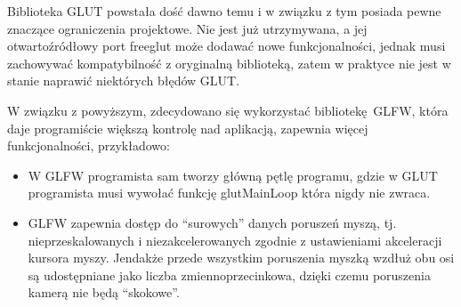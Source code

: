 \documentclass[a4paper]{article}
\begin{document}
Biblioteka GLUT powstała dość dawno temu i w związku z tym posiada pewne
znaczące ograniczenia projektowe. Nie jest już utrzymywana, a jej
otwartoźródłowy port freeglut może dodawać nowe funkcjonalności, jednak musi
zachowywać kompatybilność z oryginalną biblioteką, zatem w praktyce nie jest w
stanie naprawić niektórych błędów GLUT.

W związku z powyższym, zdecydowano się wykorzystać bibliotekę GLFW, która daje
programiście większą kontrolę nad aplikacją, zapewnia więcej funkcjonalności,
przykładowo:

\begin{itemize}
    \item W GLFW programista sam tworzy główną pętlę programu, gdzie w GLUT
          programista musi wywołać funkcję glutMainLoop która nigdy nie zwraca.

    \item GLFW zapewnia dostęp do ``surowych'' danych poruszeń myszą, tj.
          nieprzeskalowanych i niezakcelerowanych zgodnie z ustawieniami
          akceleracji kursora myszy. Jendakże przede wszystkim poruszenia myszką
          wzdłuż obu osi są udostępniane jako liczba zmiennoprzecinkowa, dzięki
          czemu poruszenia kamerą nie będą ``skokowe''.
\end{itemize}
\end{document}
